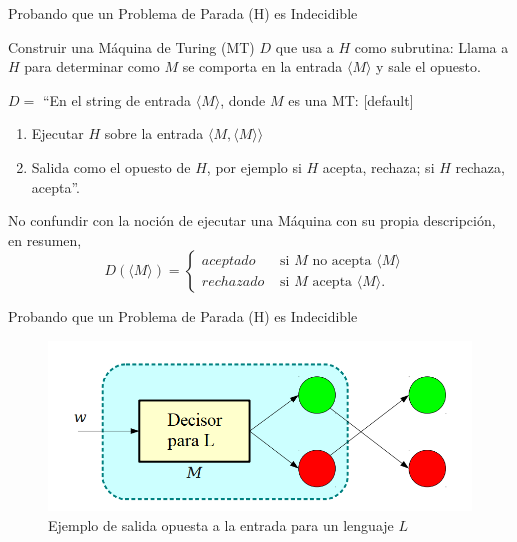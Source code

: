 \documentclass[11pt]{beamer}
\begin{document}
		\begin{frame}{Probando que un Problema de Parada (H) es Indecidible}
		
		    \justifying
		    
		    Construir una Máquina de Turing (MT) $D$ que usa a $H$ como subrutina: Llama a $H$ para determinar como $M$ se comporta en la entrada $\langle M \rangle$ y sale el opuesto.
		    
		    $D=$ ``En el string de entrada $\langle M \rangle$, donde $M$ es una MT:
		    [default]
		    \begin{enumerate}
		        \item Ejecutar $H$ sobre la entrada $\langle M, \langle M \rangle \rangle$
		        \item Salida como el opuesto de $H$, por ejemplo si $H$ acepta, rechaza; si $H$ rechaza, acepta''.
		    \end{enumerate}
		    
		    No confundir con la noción de ejecutar una Máquina con su propia descripción, en resumen,
		    \begin{equation} \label{eq:mismo}
			    D(\langle M \rangle) = \begin{cases}
                            aceptado & \text{ si $M$ no acepta $\langle M \rangle$ } \\
                            rechazado & \text{ si $M$ acepta $\langle M \rangle$. }
                        \end{cases}
			\end{equation}
		\end{frame}
		
		\begin{frame}{Probando que un Problema de Parada (H) es Indecidible}
		
		    \justifying
		    
		    \begin{figure}[H]
				\centering
				\includegraphics[scale=0.5]{img/decisorParaM.PNG}
				\caption{Ejemplo de salida opuesta a la entrada para un lenguaje $L$}
				\label{fig: DecisorParamM}
			\end{figure}
		    
		\end{frame}
		
\end{document}
